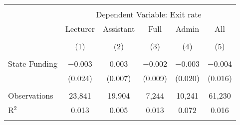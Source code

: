 
\begin{tabular}{@{\extracolsep{5pt}}lccccc} 
\\[-1.8ex]\hline 
\hline \\[-1.8ex] 
 & \multicolumn{5}{c}{Dependent Variable: Exit rate} \\ 
\cline{2-6} 
 & Lecturer & Assistant & Full & Admin & All \\ 
\\[-1.8ex] & (1) & (2) & (3) & (4) & (5)\\ 
\hline \\[-1.8ex] 
 State Funding & $-$0.003 & 0.003 & $-$0.002 & $-$0.003 & $-$0.004 \\ 
  & (0.024) & (0.007) & (0.009) & (0.020) & (0.016) \\ 
 \hline \\[-1.8ex] 
Observations & 23,841 & 19,904 & 7,244 & 10,241 & 61,230 \\ 
R$^{2}$ & 0.013 & 0.005 & 0.013 & 0.072 & 0.016 \\ 
\hline 
\hline \\[-1.8ex] 
\end{tabular} 
